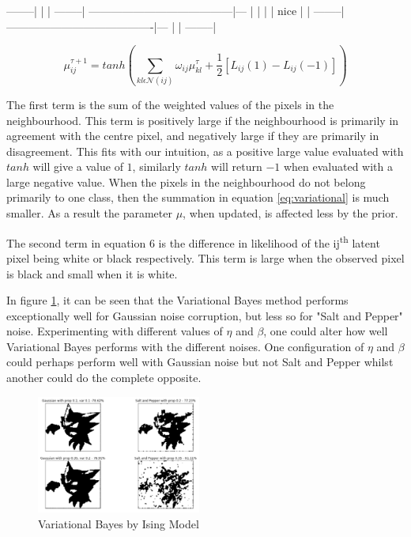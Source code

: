 \documentclass[10pt, a4paper, twocolumn]{article} %
\begin{document}
--------|
|       |
--------| ---------------------------------------|---
|                                                |   |
|                       nice                     |   |
--------|----------------------------------------|---
|       |
--------|

\begin{equation}
    {\mu}_{ij}^{\tau+1} = tanh\left(\sum_{{kl}\epsilon\mathcal{N}(ij)} \omega_{ij}\mu_{kl}^\tau + \frac{1}{2}\left[L_{ij}(1) - L_{ij}(-1)\right] \right)
    \label{eq:variational}
\end{equation}

The first term is the sum of the weighted values of the pixels in the neighbourhood. This term is positively large if the neighbourhood is primarily in agreement with the centre pixel, and negatively large if they are primarily in disagreement. This fits with our intuition, as a positive large value evaluated with $tanh$ will give a value of $1$, similarly $tanh$ will return $-1$ when evaluated with a large negative value. When the pixels in the neighbourhood do not belong primarily to one class, then the summation in equation \ref{eq:variational} is much smaller. As a result the parameter $\mu$, when updated, is affected less by the prior.


The second term in equation 6 is the difference in likelihood of the ij\textsuperscript{th} latent pixel being white or black respectively. This term is large when the observed pixel is black and small when it is white.

In figure \ref{fig:variationalBayes}, it can be seen that the Variational Bayes method performs exceptionally well for Gaussian noise corruption, but less so for "Salt and Pepper" noise. Experimenting with different values of $\eta$ and $\beta$, one could alter how well Variational Bayes performs with the different noises. One configuration of $\eta$ and $\beta$ could perhaps perform well with Gaussian noise but not Salt and Pepper whilst another could do the complete opposite.

\begin{figure}[h]
    \centering
    \includegraphics[width=0.48\textwidth]{images/variationalBayes.png}
    \caption{Variational Bayes by Ising Model}
    \label{fig:variationalBayes}
\end{figure}
\end{document}
